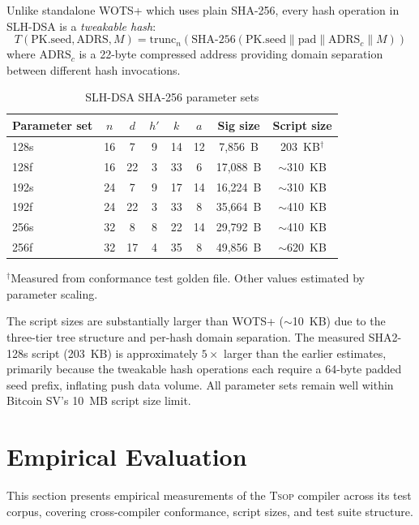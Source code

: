 \documentclass[11pt,a4paper]{article}
\newcommand{\tsop}{\textsc{Tsop}}
\begin{document}
Unlike standalone WOTS+ which uses plain SHA-256, every hash operation in
SLH-DSA is a \emph{tweakable hash}:
\[
  T(\text{PK.seed}, \text{ADRS}, M) =
  \text{trunc}_n\!\left(\text{SHA-256}(\text{PK.seed} \| \text{pad} \| \text{ADRS}_c \| M)\right)
\]
where $\text{ADRS}_c$ is a 22-byte compressed address providing domain
separation between different hash invocations.

\begin{table}[h]
\centering
\caption{SLH-DSA SHA-256 parameter sets}
\label{tab:slhdsa}
\begin{tabular}{@{}lccccccc@{}}
\toprule
Parameter set & $n$ & $d$ & $h'$ & $k$ & $a$ & Sig size & Script size \\
\midrule
128s & 16 & 7 & 9 & 14 & 12 & 7,856~B & 203~KB$^\dagger$ \\
128f & 16 & 22 & 3 & 33 & 6 & 17,088~B & $\sim$310~KB \\
192s & 24 & 7 & 9 & 17 & 14 & 16,224~B & $\sim$310~KB \\
192f & 24 & 22 & 3 & 33 & 8 & 35,664~B & $\sim$410~KB \\
256s & 32 & 8 & 8 & 22 & 14 & 29,792~B & $\sim$410~KB \\
256f & 32 & 17 & 4 & 35 & 8 & 49,856~B & $\sim$620~KB \\
\bottomrule
\end{tabular}
\vspace{0.3em}
\footnotesize{$^\dagger$Measured from conformance test golden file.
  Other values estimated by parameter scaling.}
\end{table}

The script sizes are substantially larger than WOTS+ ($\sim$10~KB)
due to the three-tier tree structure and per-hash domain separation.
The measured SHA2-128s script (203~KB) is approximately $5\times$ larger
than the earlier estimates, primarily because the tweakable hash
operations each require a 64-byte padded seed prefix, inflating push
data volume. All parameter sets remain well within Bitcoin SV's 10~MB
script size limit.

\section{Empirical Evaluation}
\label{sec:evaluation}

This section presents empirical measurements of the \tsop{} compiler across
its test corpus, covering cross-compiler conformance, script sizes, and
test suite structure.
\end{document}
